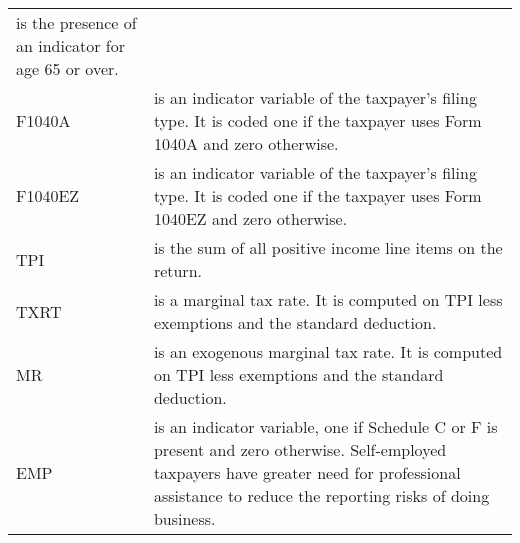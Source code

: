 \documentclass[]{book}
\begin{document}
\begin{longtable}[]{@{}ll@{}}
\begin{minipage}[t]{0.40\columnwidth}
is the presence of an indicator for age 65 or over.\strut
\end{minipage}\tabularnewline
\begin{minipage}[t]{0.54\columnwidth}\raggedright
F1040A\strut
\end{minipage} & \begin{minipage}[t]{0.40\columnwidth}\raggedright
is an indicator variable of the taxpayer's filing type. It is coded one if the taxpayer uses Form 1040A and zero otherwise.\strut
\end{minipage}\tabularnewline
\begin{minipage}[t]{0.54\columnwidth}\raggedright
F1040EZ\strut
\end{minipage} & \begin{minipage}[t]{0.40\columnwidth}\raggedright
is an indicator variable of the taxpayer's filing type. It is coded one if the taxpayer uses Form 1040EZ and zero otherwise.\strut
\end{minipage}\tabularnewline
\begin{minipage}[t]{0.54\columnwidth}\raggedright
TPI\strut
\end{minipage} & \begin{minipage}[t]{0.40\columnwidth}\raggedright
is the sum of all positive income line items on the return.\strut
\end{minipage}\tabularnewline
\begin{minipage}[t]{0.54\columnwidth}\raggedright
TXRT\strut
\end{minipage} & \begin{minipage}[t]{0.40\columnwidth}\raggedright
is a marginal tax rate. It is computed on TPI less exemptions and the standard deduction.\strut
\end{minipage}\tabularnewline
\begin{minipage}[t]{0.54\columnwidth}\raggedright
MR\strut
\end{minipage} & \begin{minipage}[t]{0.40\columnwidth}\raggedright
is an exogenous marginal tax rate. It is computed on TPI less exemptions and the standard deduction.\strut
\end{minipage}\tabularnewline
\begin{minipage}[t]{0.54\columnwidth}\raggedright
EMP\strut
\end{minipage} & \begin{minipage}[t]{0.40\columnwidth}\raggedright
is an indicator variable, one if Schedule C or F is present and zero otherwise. Self-employed taxpayers have greater need for professional assistance to reduce the reporting risks of doing business.\strut

\end{minipage}
\end{longtable}
\end{document}
